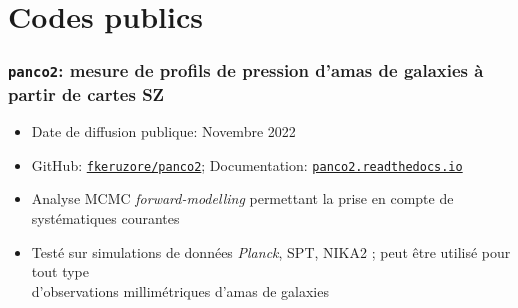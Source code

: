 \section{Codes publics}

\subsubsection{\texttt{panco2}: mesure de profils de pression d'amas de galaxies à partir de cartes SZ}

\vspace{5pt}
\begin{itemize}
    \setlength{\itemsep}{0pt}
    \item Date de diffusion publique: Novembre 2022
    \item GitHub: \href{https://github.com/fkeruzore/panco2}{\texttt{fkeruzore/panco2}}; Documentation: \href{https://panco2.readthedocs.io/en/latest/}{\texttt{panco2.readthedocs.io}}
    \item Analyse MCMC \textit{forward-modelling} permettant la prise en compte de systématiques courantes
    \item Testé sur simulations de données \textit{Planck}, SPT, NIKA2 ; peut être utilisé pour tout type \\ d'observations millimétriques d'amas de galaxies
\end{itemize} 
